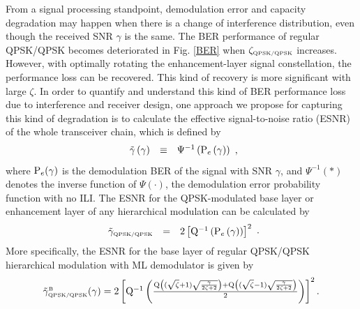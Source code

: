 \documentclass[conference]{IEEEtran}
\begin{document}
From a signal processing standpoint, demodulation error and
capacity degradation may happen when there is a change of
interference distribution, even though the received SNR $\gamma$
is the same. The BER performance of regular QPSK/QPSK becomes
deteriorated in Fig. \ref{BER} when $\zeta_{\mbox{\tiny
QPSK/QPSK}}$ increases. However, with optimally rotating the
enhancement-layer signal constellation, the performance loss can
be recovered. This kind of recovery is more significant with large
$\zeta$. In order to quantify and understand this kind of BER
performance loss due to interference and receiver design, one
approach we propose for capturing this kind of degradation is to
calculate the effective signal-to-noise ratio (ESNR) of the whole
transceiver chain, which is defined by
\begin{equation}
\begin{array}{rcl}
\tilde{\gamma}\left(\gamma\right)&\equiv&\Psi^{-1}\left({\rm
P}_{e}\left(\gamma\right)\right)
\end{array},\label{eff_SNR}
\end{equation}
\noindent where ${\rm P}_{e}(\gamma)$ is the demodulation BER of
the signal with SNR $\gamma$, and $\Psi^{-1}\left(\ast\right)$
denotes the inverse function of $\Psi\left(\cdot\right)$, the
demodulation error probability function with no ILI. The ESNR for
the QPSK-modulated base layer or enhancement layer of any
hierarchical modulation can be calculated by
\begin{equation}
\begin{array}{rcl}
\tilde{\gamma}_{\mbox{\tiny QPSK/QPSK}}&=&2\left[{\rm
Q}^{-1}\left({\rm P}_{e}\left(\gamma\right)\right)\right]^2
\end{array}.\label{eff_SNR_QPSK}
\end{equation}
\noindent More specifically, the ESNR for the base layer of
regular QPSK/QPSK hierarchical modulation with ML demodulator is
given by
\begin{equation}\hspace{-0.00in}
\begin{array}{l}
\tilde{\gamma}_{\mbox{\tiny QPSK/QPSK}}^{\mbox{\tiny
B}}(\gamma)=2\left[{\rm Q}^{-1}\left(\frac{{\rm
Q}\left((\sqrt{\zeta}+1)\sqrt{\frac{\gamma}{2\zeta+2}}\right)+{\rm
Q}\left((\sqrt{\zeta}-1)\sqrt{\frac{\gamma}{2\zeta+2}}\right)}{2}\right)\right]^2.
\end{array}\label{eff_SNR_QPSK_QPSK}
\end{equation}
\end{document}
